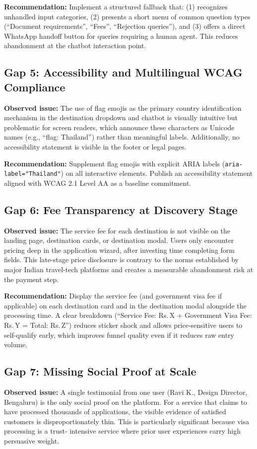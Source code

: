\documentclass[journal, 10pt, twoside]{IEEEtran}
\begin{document}
\textbf{Recommendation:} Implement a structured fallback that:
(1) recognizes unhandled input categories, (2) presents a short menu
of common question types (``Document requirements'', ``Fees'',
``Rejection queries''), and (3) offers a direct WhatsApp handoff
button for queries requiring a human agent. This reduces abandonment
at the chatbot interaction point.

\subsection{Gap 5: Accessibility and Multilingual WCAG Compliance}
\textbf{Observed issue:} The use of flag emojis as the primary country
identification mechanism in the destination dropdown and chatbot
is visually intuitive but problematic for screen readers, which
announce these characters as Unicode names (e.g., ``flag: Thailand'')
rather than meaningful labels. Additionally, no accessibility
statement is visible in the footer or legal pages.

\textbf{Recommendation:} Supplement flag emojis with explicit ARIA
labels (\texttt{aria-label="Thailand"}) on all interactive elements.
Publish an accessibility statement aligned with WCAG 2.1 Level AA as
a baseline commitment.

\subsection{Gap 6: Fee Transparency at Discovery Stage}
\textbf{Observed issue:} The service fee for each destination is not
visible on the landing page, destination cards, or destination modal.
Users only encounter pricing deep in the application wizard, after
investing time completing form fields. This late-stage price disclosure
is contrary to the norms established by major Indian travel-tech
platforms and creates a measurable abandonment risk at the payment step.

\textbf{Recommendation:} Display the service fee (and government visa
fee if applicable) on each destination card and in the destination modal
alongside the processing time. A clear breakdown (``Service Fee: Rs.\,X
+ Government Visa Fee: Rs.\,Y = Total: Rs.\,Z'') reduces sticker
shock and allows price-sensitive users to self-qualify early, which
improves funnel quality even if it reduces raw entry volume.

\subsection{Gap 7: Missing Social Proof at Scale}
\textbf{Observed issue:} A single testimonial from one user (Ravi K.,
Design Director, Bengaluru) is the only social proof on the platform.
For a service that claims to have processed thousands of applications,
the visible evidence of satisfied customers is disproportionately thin.
This is particularly significant because visa processing is a trust-
intensive service where prior user experiences carry high persuasive
weight.
\end{document}
